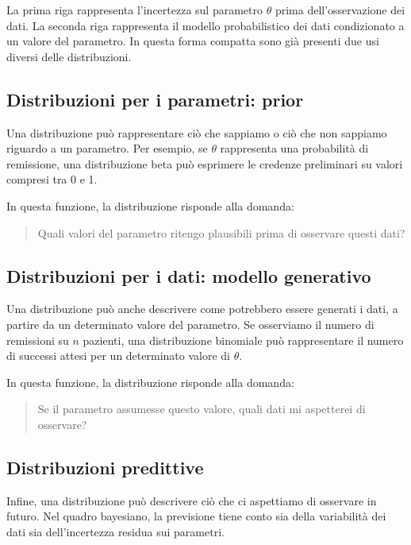 \documentclass[
  italian,
  letterpaper,
  a4paper,
  11pt,
  open=any]{scrbook}
\theoremstyle{plain}
\theoremstyle{definition}
\theoremstyle{definition}
\theoremstyle{remark}
\begin{document}
La prima riga rappresenta l'incertezza sul parametro \(\theta\) prima
dell'osservazione dei dati. La seconda riga rappresenta il modello
probabilistico dei dati condizionato a un valore del parametro. In
questa forma compatta sono già presenti due usi diversi delle
distribuzioni.

\subsection{Distribuzioni per i parametri:
prior}\label{distribuzioni-per-i-parametri-prior}

Una distribuzione può rappresentare ciò che sappiamo o ciò che non
sappiamo riguardo a un parametro. Per esempio, se \(\theta\) rappresenta
una probabilità di remissione, una distribuzione beta può esprimere le
credenze preliminari su valori compresi tra 0 e 1.

In questa funzione, la distribuzione risponde alla domanda:

\begin{quote}
Quali valori del parametro ritengo plausibili prima di osservare questi
dati?
\end{quote}

\subsection{Distribuzioni per i dati: modello
generativo}\label{distribuzioni-per-i-dati-modello-generativo}

Una distribuzione può anche descrivere come potrebbero essere generati i
dati, a partire da un determinato valore del parametro. Se osserviamo il
numero di remissioni su \(n\) pazienti, una distribuzione binomiale può
rappresentare il numero di successi attesi per un determinato valore di
\(\theta\).

In questa funzione, la distribuzione risponde alla domanda:

\begin{quote}
Se il parametro assumesse questo valore, quali dati mi aspetterei di
osservare?
\end{quote}

\subsection{Distribuzioni predittive}\label{distribuzioni-predittive}

Infine, una distribuzione può descrivere ciò che ci aspettiamo di
osservare in futuro. Nel quadro bayesiano, la previsione tiene conto sia
della variabilità dei dati sia dell'incertezza residua sui parametri.
\end{document}
